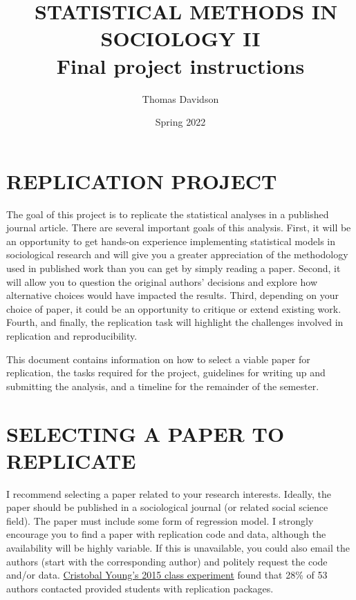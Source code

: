 \documentclass[
  12pt,
]{article}
\title{~STATISTICAL METHODS IN SOCIOLOGY II\\
\hspace*{0.333em}Final project instructions}
\author{Thomas Davidson}
\date{Spring 2022}
\begin{document}
\maketitle

\hypertarget{replication-project}{%
\section{REPLICATION PROJECT}\label{replication-project}}

The goal of this project is to replicate the statistical analyses in a
published journal article. There are several important goals of this
analysis. First, it will be an opportunity to get hands-on experience
implementing statistical models in sociological research and will give
you a greater appreciation of the methodology used in published work
than you can get by simply reading a paper. Second, it will allow you to
question the original authors' decisions and explore how alternative
choices would have impacted the results. Third, depending on your choice
of paper, it could be an opportunity to critique or extend existing
work. Fourth, and finally, the replication task will highlight the
challenges involved in replication and reproducibility.

This document contains information on how to select a viable paper for
replication, the tasks required for the project, guidelines for writing
up and submitting the analysis, and a timeline for the remainder of the
semester.

\hypertarget{selecting-a-paper-to-replicate}{%
\section{SELECTING A PAPER TO
REPLICATE}\label{selecting-a-paper-to-replicate}}

I recommend selecting a paper related to your research interests.
Ideally, the paper should be published in a sociological journal (or
related social science field). The paper must include some form of
regression model. I strongly encourage you to find a paper with
replication code and data, although the availability will be highly
variable. If this is unavailable, you could also email the authors
(start with the corresponding author) and politely request the code
and/or data.
\href{https://orgtheory.wordpress.com/2015/08/11/sociologists-need-to-be-better-at-replication-a-guest-post-by-cristobal-young/}{Cristobal Young's 2015 class experiment}
found that 28\% of 53 authors contacted provided students with
replication packages.
\end{document}
